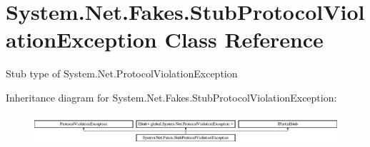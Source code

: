 \hypertarget{class_system_1_1_net_1_1_fakes_1_1_stub_protocol_violation_exception}{\section{System.\-Net.\-Fakes.\-Stub\-Protocol\-Violation\-Exception Class Reference}
\label{class_system_1_1_net_1_1_fakes_1_1_stub_protocol_violation_exception}
}


Stub type of System.\-Net.\-Protocol\-Violation\-Exception 


Inheritance diagram for System.\-Net.\-Fakes.\-Stub\-Protocol\-Violation\-Exception\-:\begin{figure}[H]
\begin{center}
\leavevmode
\includegraphics[height=1.138211cm]{class_system_1_1_net_1_1_fakes_1_1_stub_protocol_violation_exception}
\end{center}
\end{figure}
